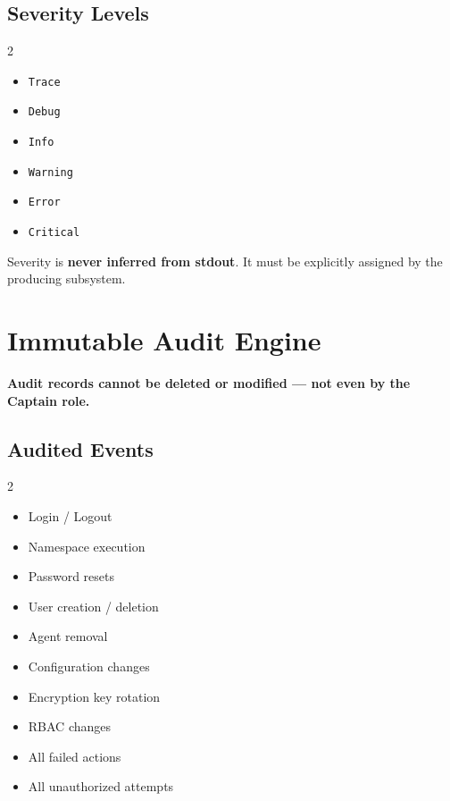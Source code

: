 \documentclass[12pt,a4paper]{article}
\begin{document}
\subsection{Severity Levels}

\begin{multicols}{2}
\begin{itemize}[noitemsep,leftmargin=*]
    \item \texttt{Trace}
    \item \texttt{Debug}
    \item \texttt{Info}
    \item \texttt{Warning}
    \item \texttt{Error}
    \item \texttt{Critical}
\end{itemize}
\end{multicols}

Severity is \textbf{never inferred from stdout}. It must be explicitly assigned by the producing subsystem.

\section{Immutable Audit Engine}

\begin{warningbox}
\textbf{Audit records cannot be deleted or modified — not even by the Captain role.}
\end{warningbox}

\subsection{Audited Events}

\begin{multicols}{2}
\begin{itemize}[noitemsep,leftmargin=*]
    \item Login / Logout
    \item Namespace execution
    \item Password resets
    \item User creation / deletion
    \item Agent removal
    \item Configuration changes
    \item Encryption key rotation
    \item RBAC changes
    \item All failed actions
    \item All unauthorized attempts
\end{itemize}
\end{multicols}
\end{document}
